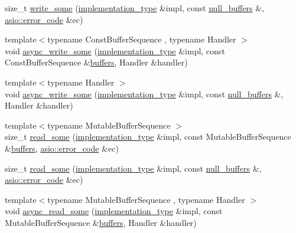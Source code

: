 \begin{DoxyCompactItemize}
\item 
size\+\_\+t \hyperlink{classasio_1_1detail_1_1reactive__descriptor__service_a2861ebc69c85c2c418bf144ff22b9317}{write\+\_\+some} (\hyperlink{classasio_1_1detail_1_1reactive__descriptor__service_1_1implementation__type}{implementation\+\_\+type} \&impl, const \hyperlink{classasio_1_1null__buffers}{null\+\_\+buffers} \&, \hyperlink{classasio_1_1error__code}{asio\+::error\+\_\+code} \&ec)
\item 
{\footnotesize template$<$typename Const\+Buffer\+Sequence , typename Handler $>$ }\\void \hyperlink{classasio_1_1detail_1_1reactive__descriptor__service_a1e9aaa9a956fbbe89ab5fccf37128a01}{async\+\_\+write\+\_\+some} (\hyperlink{classasio_1_1detail_1_1reactive__descriptor__service_1_1implementation__type}{implementation\+\_\+type} \&impl, const Const\+Buffer\+Sequence \&\hyperlink{group__async__read_ga54dede45c3175148a77fe6635222c47d}{buffers}, Handler \&handler)
\item 
{\footnotesize template$<$typename Handler $>$ }\\void \hyperlink{classasio_1_1detail_1_1reactive__descriptor__service_ae17396b8d8d26d26d3e9c594c3e0a11c}{async\+\_\+write\+\_\+some} (\hyperlink{classasio_1_1detail_1_1reactive__descriptor__service_1_1implementation__type}{implementation\+\_\+type} \&impl, const \hyperlink{classasio_1_1null__buffers}{null\+\_\+buffers} \&, Handler \&handler)
\item 
{\footnotesize template$<$typename Mutable\+Buffer\+Sequence $>$ }\\size\+\_\+t \hyperlink{classasio_1_1detail_1_1reactive__descriptor__service_a380eee843796908b9113649102b0feae}{read\+\_\+some} (\hyperlink{classasio_1_1detail_1_1reactive__descriptor__service_1_1implementation__type}{implementation\+\_\+type} \&impl, const Mutable\+Buffer\+Sequence \&\hyperlink{group__async__read_ga54dede45c3175148a77fe6635222c47d}{buffers}, \hyperlink{classasio_1_1error__code}{asio\+::error\+\_\+code} \&ec)
\item 
size\+\_\+t \hyperlink{classasio_1_1detail_1_1reactive__descriptor__service_ae0a1699c0107b7bd20329225a822dbda}{read\+\_\+some} (\hyperlink{classasio_1_1detail_1_1reactive__descriptor__service_1_1implementation__type}{implementation\+\_\+type} \&impl, const \hyperlink{classasio_1_1null__buffers}{null\+\_\+buffers} \&, \hyperlink{classasio_1_1error__code}{asio\+::error\+\_\+code} \&ec)
\item 
{\footnotesize template$<$typename Mutable\+Buffer\+Sequence , typename Handler $>$ }\\void \hyperlink{classasio_1_1detail_1_1reactive__descriptor__service_abd7607937d924a18b976ef724dcf4f63}{async\+\_\+read\+\_\+some} (\hyperlink{classasio_1_1detail_1_1reactive__descriptor__service_1_1implementation__type}{implementation\+\_\+type} \&impl, const Mutable\+Buffer\+Sequence \&\hyperlink{group__async__read_ga54dede45c3175148a77fe6635222c47d}{buffers}, Handler \&handler)

\end{DoxyCompactItemize}
